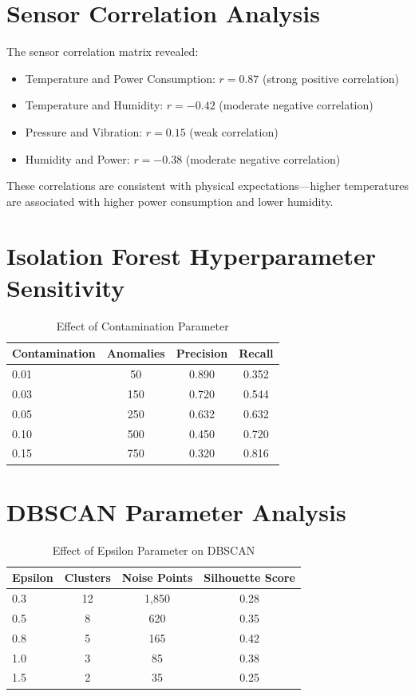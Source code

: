 \documentclass[12pt,a4paper]{report}
\begin{document}
\section{Sensor Correlation Analysis}

The sensor correlation matrix revealed:
\begin{itemize}
    \item Temperature and Power Consumption: $r = 0.87$ (strong positive correlation)
    \item Temperature and Humidity: $r = -0.42$ (moderate negative correlation)
    \item Pressure and Vibration: $r = 0.15$ (weak correlation)
    \item Humidity and Power: $r = -0.38$ (moderate negative correlation)
\end{itemize}

These correlations are consistent with physical expectations---higher temperatures are associated with higher power consumption and lower humidity.

\section{Isolation Forest Hyperparameter Sensitivity}

\begin{table}[H]
\centering
\caption{Effect of Contamination Parameter}
\begin{tabular}{lccc}
\toprule
\textbf{Contamination} & \textbf{Anomalies} & \textbf{Precision} & \textbf{Recall} \\
\midrule
0.01 & 50 & 0.890 & 0.352 \\
0.03 & 150 & 0.720 & 0.544 \\
0.05 & 250 & 0.632 & 0.632 \\
0.10 & 500 & 0.450 & 0.720 \\
0.15 & 750 & 0.320 & 0.816 \\
\bottomrule
\end{tabular}
\end{table}

\section{DBSCAN Parameter Analysis}

\begin{table}[H]
\centering
\caption{Effect of Epsilon Parameter on DBSCAN}
\begin{tabular}{lccc}
\toprule
\textbf{Epsilon} & \textbf{Clusters} & \textbf{Noise Points} & \textbf{Silhouette Score} \\
\midrule
0.3 & 12 & 1,850 & 0.28 \\
0.5 & 8 & 620 & 0.35 \\
0.8 & 5 & 165 & 0.42 \\
1.0 & 3 & 85 & 0.38 \\
1.5 & 2 & 35 & 0.25 \\
\bottomrule
\end{tabular}
\end{table}
\end{document}
